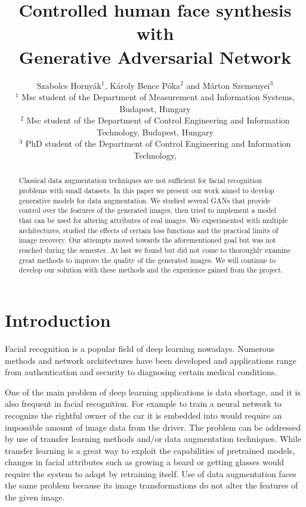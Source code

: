 \documentclass{egpubl}
\title{Controlled human face synthesis with\\
	 \space Generative Adversarial Network}
\author[Hornyák,Póka,Szemenyei]
       {Szabolcs Hornyák$^1$,
        Károly Bence Póka$^2$ and
        Márton Szemenyei$^3$
        \\
        $^1$ Msc student of the Department of Measurement and Information Systems,
             Budapest, Hungary\\
        $^2$ Msc student of the Department of Control Engineering and Information Technology,
        Budapest, Hungary\\
        $^3$ PhD student of the Department of Control Engineering and Information Technology,
       }
\begin{document}
\maketitle

\begin{abstract}
Classical data augmentation techniques are not sufficient for facial recognition problems with small datasets. In this paper we present our work aimed to develop generative models for data augmentation. We studied several GANs that provide control over the features of the generated images, then tried to implement a model that can be used for altering attributes of real images. We experimented with multiple architectures, studied the effects of certain loss functions and the practical limits of image recovery. Our attempts moved towards the aforementioned goal but was not reached during the semester. At last we found but did not come to thoroughly examine great methods to improve the quality of the generated images. We will continue to develop our solution with these methods and the experience gained from the project.


\end{abstract}

\section{Introduction}

Facial recognition is a popular field  of deep learning nowadays. Numerous methods and network architectures have been developed and applications range from authentication and security to diagnosing certain medical conditions.

One of the main problem of deep learning applications is data shortage, and it is also frequent in facial recognition. For example to train a neural network to recognize the rightful owner of the car it is embedded into would require an impossible amount of image data from the driver. The problem can be addressed by use of transfer learning methods and/or data augmentation techniques. While transfer learning is a great way to exploit the capabilities of pretrained models, changes in facial attributes such as growing a beard or getting glasses would require the system to adapt by retraining itself. Use of data augmentation faces the same problem because its image transformations do not alter the features of the given image.
\end{document}
